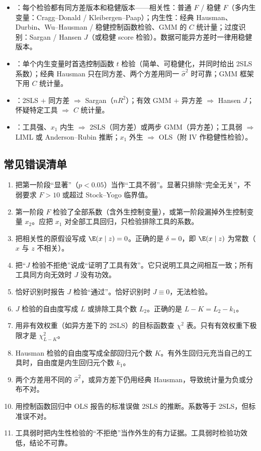\begin{itemize}
  \item {}：每个检验都有同方差版本和稳健版本——相关性：普通 $F$ / 稳健 $F$（多内生变量：Cragg--Donald / Kleibergen--Paap）；内生性：经典 Hausman、Durbin、Wu--Hausman / 稳健控制函数检验、GMM 的 $C$ 统计量；过度识别：Sargan / Hansen $J$（或稳健 score 检验）。数据可能异方差时一律用稳健版本。
  \item {}：单个内生变量时首选控制函数 $t$ 检验（简单、可稳健化，并同时给出 2SLS 系数）；经典 Hausman 只在同方差、两个方差用同一 $\hat\sigma^2$ 时可靠；GMM 框架下用 $C$ 统计量。
  \item {}：2SLS $+$ 同方差 $\Rightarrow$ Sargan（$nR^2$）；有效 GMM $+$ 异方差 $\Rightarrow$ Hansen $J$；怀疑特定工具 $\Rightarrow$ $C$ 统计量。
  \item {}：工具强、$x_1$ 内生 $\Rightarrow$ 2SLS（同方差）或两步 GMM（异方差）；工具弱 $\Rightarrow$ LIML 或 Anderson--Rubin 推断；$x_1$ 外生 $\Rightarrow$ OLS（附 IV 作稳健性检验）。
\end{itemize}

\subsection{常见错误清单}

\begin{enumerate}[label=(\arabic*)]
  \item 把第一阶段“显著”（$p<0.05$）当作“工具不弱”。显著只排除“完全无关”，不弱要求 $F>10$ 或超过 Stock--Yogo 临界值。
  \item 第一阶段 $F$ 检验了全部系数（含外生控制变量），或第一阶段漏掉外生控制变量 $x_2$。应把 $x_1$ 对全部工具回归，只检验排除工具的系数。
  \item 把相关性的原假设写成 $\E(x\mid z)=0$。正确的是 $\delta=0$，即 $\E(x\mid z)$ 为常数（$x$ 与 $z$ 不相关）。
  \item 把“$J$ 检验不拒绝”说成“证明了工具有效”。它只说明工具之间相互一致；所有工具同方向无效时 $J$ 没有功效。
  \item 恰好识别时报告 $J$ 检验“通过”。恰好识别时 $J\equiv0$，无法检验。
  \item $J$ 检验的自由度写成 $L$ 或排除工具个数 $L_2$。正确的是 $L-K=L_2-k_1$。
  \item 用非有效权重（如异方差下的 2SLS）的目标函数查 $\chi^2$ 表。只有有效权重下极限才是 $\chi^2_{L-K}$。
  \item Hausman 检验的自由度写成全部回归元个数 $K$。有外生回归元充当自己的工具时，自由度是内生回归元个数 $k_1$。
  \item 两个方差用不同的 $\hat\sigma^2$，或异方差下仍用经典 Hausman，导致统计量为负或分布不对。
  \item 用控制函数回归中 OLS 报告的标准误做 2SLS 的推断。系数等于 2SLS，但标准误不对。
  \item 工具弱时把内生性检验的“不拒绝”当作外生的有力证据。工具弱时检验功效低，结论不可靠。
\end{enumerate}

